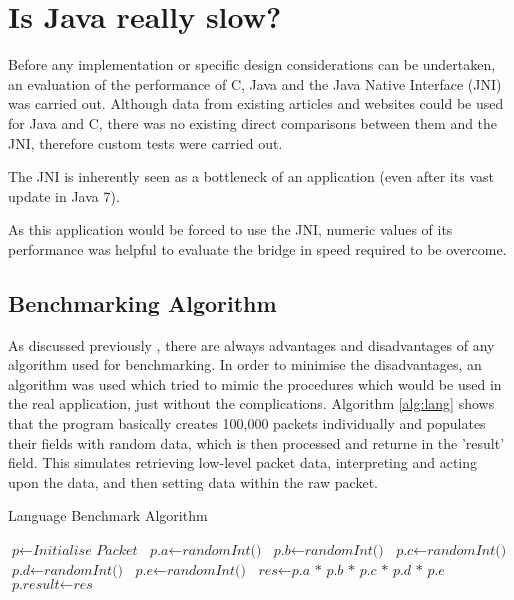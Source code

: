 \documentclass[final_report.tex]{subfiles}
\begin{document}
\section{Is Java really slow?}
Before any implementation or specific design considerations can be undertaken, an evaluation of the performance of C, Java and the Java Native Interface (JNI) was carried out. Although data from existing articles and websites could be used for Java and C, there was no existing direct comparisons between them and the JNI, therefore custom tests were carried out.

The JNI is inherently  seen as a bottleneck of an application (even after its vast update in Java 7). 

As this application would be forced to use the JNI, numeric values of its performance was helpful to evaluate the bridge in speed required to be overcome.

\subsection{Benchmarking Algorithm}
As discussed previously , there are always advantages and disadvantages of any algorithm used for benchmarking. In order to minimise the disadvantages, an algorithm was used which tried to mimic the procedures which would be used in the real application, just without the complications. Algorithm \ref{alg:lang} shows that the program basically creates 100,000 packets individually and populates their fields with random data, which is then processed and returne in the 'result' field. This simulates retrieving low-level packet data, interpreting and acting upon the data, and then setting data within the raw packet.

\begin{algorithm}[H]
	\caption{Language Benchmark Algorithm}
	\label{alg:lang}
	\begin{algorithmic}[1]
				\State $\textit{p} \gets \textit{Initialise Packet}$
				\State {}
				\State {}
			\EndFor
		\EndFunction
		\newline
		 
			\State $\textit{p.a} \gets \textit{randomInt()}$
			\State $\textit{p.b} \gets \textit{randomInt()}$
			\State $\textit{p.c} \gets \textit{randomInt()}$
			\State $\textit{p.d} \gets \textit{randomInt()}$
			\State $\textit{p.e} \gets \textit{randomInt()}$
		\EndFunction
		\newline
		 
			\State $\textit{res} \gets \textit{p.a * p.b * p.c * p.d * p.e}$
			\State $\textit{p.result} \gets \textit{res}$
		\EndFunction
	\end{algorithmic}
\end{algorithm}
\end{document}
